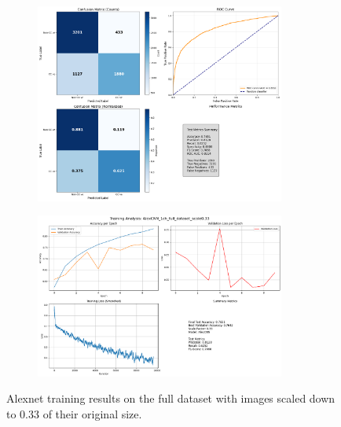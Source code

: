 \documentclass{pracalicmgr}
\begin{document}
\begin{figure}[H]
    \centering
    \begin{subfigure}{\textwidth}
        \centering
        \includegraphics[width=0.9\textwidth]{src/AlexCNN_1ch_full_dataset_scale033.png}
        \label{fig:full33sub1}
    \end{subfigure}
    
    \vspace{1cm}
    
    \begin{subfigure}{\textwidth}
        \centering
        \includegraphics[width=0.9\textwidth]{src/AlexCNN_1ch_full_dataset_scale0.33loss.png}
        \label{fig:full33sub2}
    \end{subfigure}
    \caption{Alexnet training results on the full dataset with images scaled down to 0.33 of their original size.}
    \label{fig:full33stacked}
\end{figure}
\end{document}
